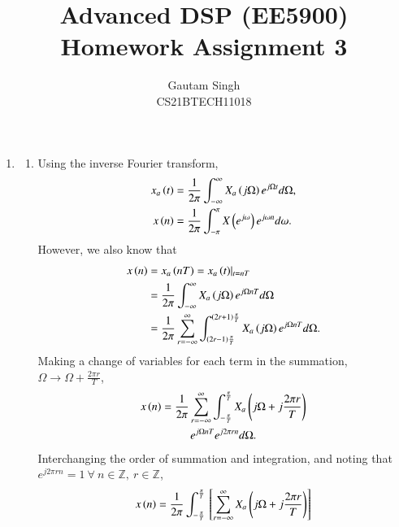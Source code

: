 \documentclass[journal,12pt,twocolumn]{IEEEtran}
\begin{document}
\vspace{3cm}
\title{Advanced DSP (EE5900)\\Homework Assignment 3}
\author{Gautam Singh\\CS21BTECH11018}
\maketitle
\bigskip

\begin{enumerate}[label=\theenumi.]
    \item 
    \begin{enumerate}
        \item Using the inverse Fourier transform,
        \begin{align}
            x_a\left(t\right) &= \frac{1}{2\pi}\int_{-\infty}^{\infty}X_a\left(j\Omega\right)e^{j\Omega{}t}d\Omega, \\
            x\left(n\right) &= \frac{1}{2\pi}\int_{-\pi}^{\pi}X\left(e^{j\omega}\right)e^{j\omega{}n}d\omega.
            \label{eq:x-ift}
        \end{align}
        However, we also know that
        \begin{align}
            x\left(n\right) &= x_a\left(nT\right) = x_a\left(t\right)\rvert_{t=nT} \\
            &= \frac{1}{2\pi}\int_{-\infty}^{\infty}X_a\left(j\Omega\right)e^{j\Omega{}nT}d\Omega \\
            &= \frac{1}{2\pi}\sum_{r=-\infty}^{\infty}\int_{\left(2r-1\right)\frac{\pi}{T}}^{\left(2r+1\right)\frac{\pi}{T}}X_a\left(j\Omega\right)e^{j\Omega{}nT}d\Omega.
            \label{eq:x-n-sub}
        \end{align}
        Making a change of variables for each term in the summation, \(\Omega
        \rightarrow \Omega + \frac{2\pi{}r}{T}\),
        \begin{multline}
            x\left(n\right) = \frac{1}{2\pi}\sum_{r=-\infty}^{\infty}\int_{-\frac{\pi}{T}}^{\frac{\pi}{T}}X_a\left(j\Omega+j\frac{2\pi{}r}{T}\right) \\
            e^{j\Omega{}nT}e^{j2\pi{}rn}d\Omega.
            \label{eq:x-n-sum}
        \end{multline}
        Interchanging the order of summation and integration, and noting that
        \(e^{j2\pi{}rn} = 1\ \forall\ n\in\mathbb{Z},\ r\in\mathbb{Z}\),
        \begin{multline}
            x\brak{n} = \frac{1}{2\pi}\int_{-\frac{\pi}{T}}^{\frac{\pi}{T}}\sbrak{\sum_{r=-\infty}^{\infty}X_a\brak{j\Omega+j\frac{2\pi{}r}{T}}} \\

\end{multline}
\end{enumerate}
\end{enumerate}
\end{document}
